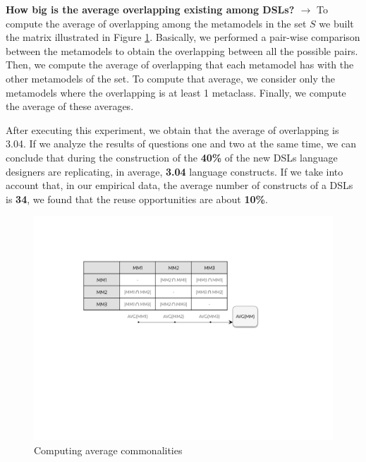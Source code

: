 \textbf{How big is the average overlapping existing among DSLs? $\rightarrow$} To compute the average of overlapping among the metamodels in the set $S$ we built the matrix illustrated in Figure \ref{fig:matrix-evaluation}. Basically, we performed a pair-wise comparison between the metamodels to obtain the overlapping between all the possible pairs. Then, we compute the average of overlapping that each metamodel has with the other metamodels of the set. To compute that average, we consider only the metamodels where the overlapping is at least 1 metaclass. Finally, we compute the average of these averages.

After executing this experiment, we obtain that the average of overlapping is 3.04. If we analyze the results of questions one and two at the same time, we can conclude that during the construction of the \textbf{40\%} of the new DSLs language designers are replicating, in average, \textbf{3.04} language constructs. If we take into account that, in our empirical data, the average number of constructs of a DSLs is \textbf{34}, we found that the reuse opportunities are about \textbf{10\%}. 

\begin{figure}[h!]
\centering
\includegraphics[width=0.75\linewidth]{images/matrix-evaluation.pdf}
\caption{Computing average commonalities}
\label{fig:matrix-evaluation}
\end{figure}



